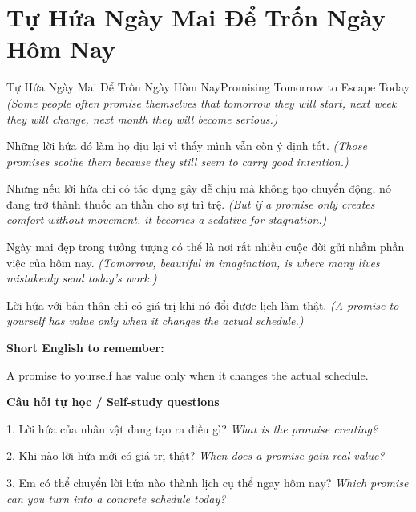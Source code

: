 \section{Tự Hứa Ngày Mai Để Trốn Ngày Hôm Nay}
\begin{truyen}{Tự Hứa Ngày Mai Để Trốn Ngày Hôm Nay}{Promising Tomorrow to Escape Today}
\textit{(Some people often promise themselves that tomorrow they will start, next week they will change, next month they will become serious.)}

Những lời hứa đó làm họ dịu lại vì thấy mình vẫn còn ý định tốt.
\textit{(Those promises soothe them because they still seem to carry good intention.)}

Nhưng nếu lời hứa chỉ có tác dụng gây dễ chịu mà không tạo chuyển động, nó đang trở thành thuốc an thần cho sự trì trệ.
\textit{(But if a promise only creates comfort without movement, it becomes a sedative for stagnation.)}

Ngày mai đẹp trong tưởng tượng có thể là nơi rất nhiều cuộc đời gửi nhầm phần việc của hôm nay.
\textit{(Tomorrow, beautiful in imagination, is where many lives mistakenly send today’s work.)}

\end{truyen}

\begin{baihoc}
Lời hứa với bản thân chỉ có giá trị khi nó đổi được lịch làm thật.
\textit{(A promise to yourself has value only when it changes the actual schedule.)}
\end{baihoc}

\begin{ghinhoanh}
\textbf{Short English to remember:}

A promise to yourself has value only when it changes the actual schedule.

\end{ghinhoanh}

\begin{tuhocnhanh}
\textbf{Câu hỏi tự học / Self-study questions}

1. Lời hứa của nhân vật đang tạo ra điều gì? \textit{What is the promise creating?}

2. Khi nào lời hứa mới có giá trị thật? \textit{When does a promise gain real value?}

3. Em có thể chuyển lời hứa nào thành lịch cụ thể ngay hôm nay? \textit{Which promise can you turn into a concrete schedule today?}
\end{tuhocnhanh}
\ngancach

